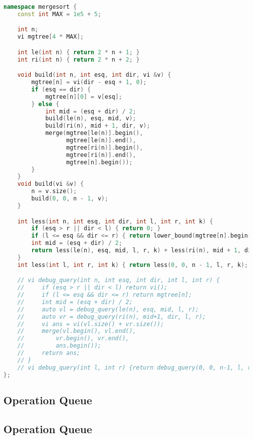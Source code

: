 \documentclass[11pt, a4paper, twoside]{article}
\begin{document}
\begin{lstlisting}[language=C++]
namespace mergesort {
    const int MAX = 1e5 + 5;

    int n;
    vi mgtree[4 * MAX];

    int le(int n) { return 2 * n + 1; }
    int ri(int n) { return 2 * n + 2; }

    void build(int n, int esq, int dir, vi &v) {
        mgtree[n] = vi(dir - esq + 1, 0);
        if (esq == dir) {
            mgtree[n][0] = v[esq];
        } else {
            int mid = (esq + dir) / 2;
            build(le(n), esq, mid, v);
            build(ri(n), mid + 1, dir, v);
            merge(mgtree[le(n)].begin(),
                  mgtree[le(n)].end(),
                  mgtree[ri(n)].begin(),
                  mgtree[ri(n)].end(),
                  mgtree[n].begin());
        }
    }
    void build(vi &v) {
        n = v.size();
        build(0, 0, n - 1, v);
    }

    int less(int n, int esq, int dir, int l, int r, int k) {
        if (esq > r || dir < l) { return 0; }
        if (l <= esq && dir <= r) { return lower_bound(mgtree[n].begin(), mgtree[n].end(), k) - mgtree[n].begin(); }
        int mid = (esq + dir) / 2;
        return less(le(n), esq, mid, l, r, k) + less(ri(n), mid + 1, dir, l, r, k);
    }
    int less(int l, int r, int k) { return less(0, 0, n - 1, l, r, k); }

    // vi debug_query(int n, int esq, int dir, int l, int r) {
    //     if (esq > r || dir < l) return vi();
    //     if (l <= esq && dir <= r) return mgtree[n];
    //     int mid = (esq + dir) / 2;
    //     auto vl = debug_query(le(n), esq, mid, l, r);
    //     auto vr = debug_query(ri(n), mid+1, dir, l, r);
    //     vi ans = vi(vl.size() + vr.size());
    //     merge(vl.begin(), vl.end(),
    //         vr.begin(), vr.end(),
    //         ans.begin());
    //     return ans;
    // }
    // vi debug_query(int l, int r) {return debug_query(0, 0, n-1, l, r);}
};
\end{lstlisting}

\subsection{Operation Queue}

\subsection{Operation Queue}
\end{document}
